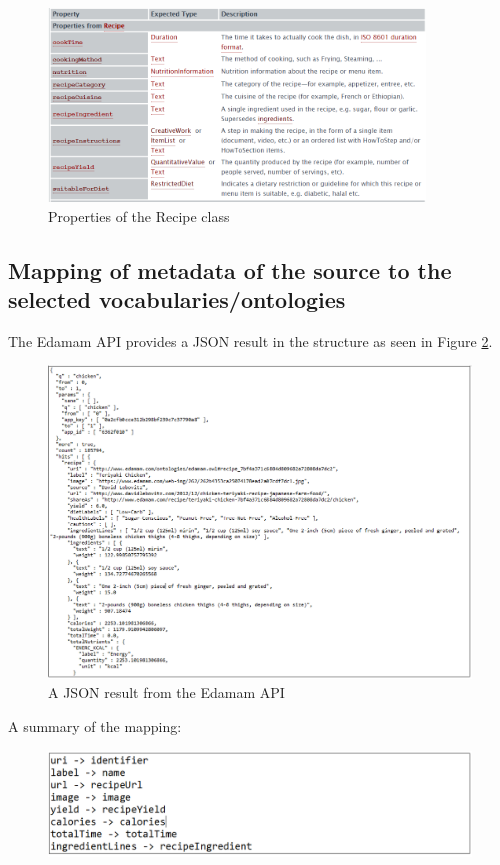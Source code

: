 \documentclass{article}
\begin{document}
\begin{figure}[H]
  \centering
  \includegraphics[width=10cm]{pictures/init_voc2.png}
  \caption{Properties of the Recipe class}
  \label{fig:initvoc2}
\end{figure}
\noindent

\subsection{Mapping of metadata of the source to the selected vocabularies/ontologies}
The Edamam API provides a JSON result in the structure as seen in Figure \ref{fig:map}.

\begin{figure}[H]
  \centering
  \includegraphics[width=12cm]{pictures/mapping.png}
  \caption{A JSON result from the Edamam API}
  \label{fig:map}
\end{figure}
\noindent
A summary of the mapping:

\begin{figure}[H]
  \centering
  \includegraphics[width=12cm]{pictures/mapping_sum.png}
  \label{fig:mapsum}
\end{figure}
\noindent
\end{document}
